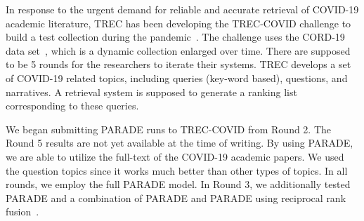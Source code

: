 \documentclass[11pt,a4paper]{article}
\newcommand{\parade}[1]{PARADE}
\begin{document}
\begin{table}[htb]
    \centering
    \caption{Ranking  effectiveness of different retrieval systems in the TREC-COVID Round 4.}
    \label{tab:covid_r4}
\end{table}
In response to the urgent demand for reliable and accurate retrieval of COVID-19 academic literature, TREC has been developing the TREC-COVID challenge to build a test collection during the pandemic~\cite{DBLP:journals/corr/abs-2005-04474}.
The challenge uses the CORD-19 data set~\cite{DBLP:journals/corr/abs-2004-10706}, which is a dynamic collection enlarged over time.
There are supposed to be 5 rounds for the researchers to iterate their systems.
TREC develops a set of COVID-19 related topics, including queries (key-word based), questions, and narratives.
A retrieval system is supposed to generate a ranking list corresponding to these queries.

We began submitting PARADE runs to TREC-COVID from Round 2.
The Round 5 results are not yet available at the time of writing.
By using PARADE, we are able to utilize the full-text of the COVID-19 academic papers.
We used the question topics since it works much better than other types of topics.
In all rounds, we employ the full \parade{} model.
In Round 3, we additionally tested \parade{Attn} and a combination of \parade{} and \parade{Attn} using reciprocal rank fusion~\cite{10.1145/1571941.1572114}.
\end{document}
